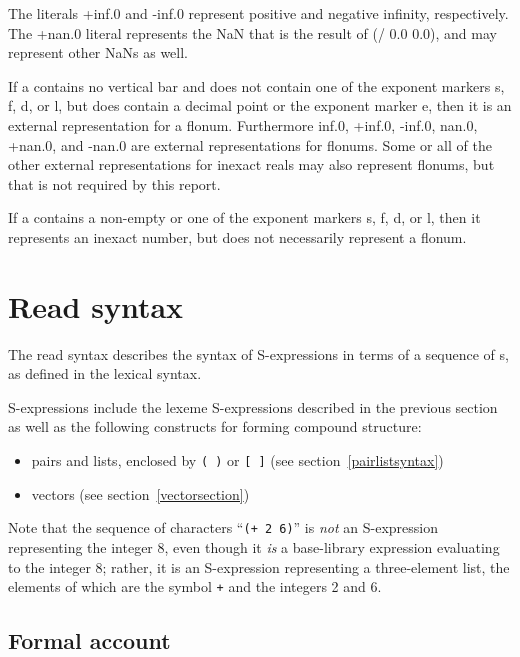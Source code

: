 The literals {\cf +inf.0} and {\cf -inf.0} represent positive and
negative infinity, respectively.  The {\cf +nan.0}
literal represents the NaN that is the result of {\cf (/ 0.0 0.0)},
and may represent other NaNs as well.

If a  contains no vertical bar
and does not contain one of the exponent markers {\cf s},
{\cf f}, {\cf d}, or {\cf l}, but does contain a decimal point or the
exponent marker {\cf e}, then it is an external representation for a
flonum.  Furthermore {\cf inf.0}, {\cf +inf.0}, {\cf -inf.0}, {\cf
  nan.0}, {\cf +nan.0}, and {\cf -nan.0} are external representations
for flonums.  Some or all of the other external representations for
inexact reals may also represent flonums, but that is not required by
this report.

If a  contains a non-empty  or
one of the exponent markers {\cf s}, {\cf f}, {\cf d}, or {\cf l},
then it represents an inexact number, but does not necessarily
represent a flonum.

\section{Read syntax}
\label{readsyntaxsection}

The read syntax describes the syntax of
S-expressions in terms of a sequence of
s, as defined in the lexical syntax.

S-expressions include the lexeme S-expressions described in the
previous section as well as the following constructs for forming
compound structure:
%
\begin{itemize}
\item pairs and lists, enclosed by \verb|( )| or \verb|[ ]| (see
  section~\ref{pairlistsyntax})
\item  vectors (see section~\ref{vectorsection})
\end{itemize}

Note that the sequence of characters ``{\tt(+ 2 6)}'' is {\em not} an
S-expression representing the integer 8, even though it {\em is} a
base-library expression evaluating to the integer 8; rather, it is an
S-expression representing a three-element list, the elements of which
are the symbol {\tt +} and the integers 2 and 6.

\subsection{Formal account}
\label{datumsyntax}

